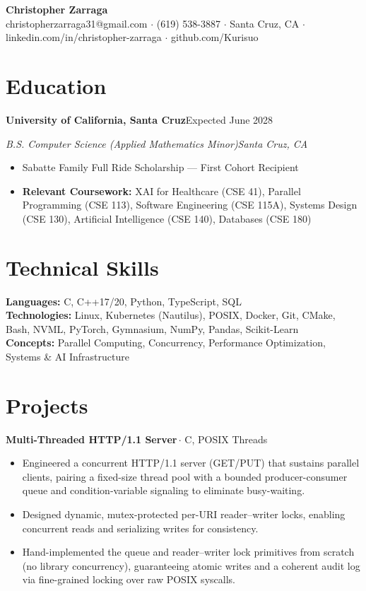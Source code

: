 \documentclass[letterpaper,10pt]{article}
\newcommand{\bull}[1]{\item\small{#1}}
\newcommand{\entryTwo}[4]{%
  \vspace{0.5pt}
  {\noindent\textbf{#1}\hfill\textcolor{slate}{\small #2}\par}
  {\noindent\textcolor{slate}{\small\textit{#3}}\hfill\textcolor{slate}{\small\textit{#4}}\par}
  \vspace{-1pt}
}
\newcommand{\projTitle}[2]{%
  \vspace{1pt}
  {\noindent\textbf{#1}\,\textcolor{slate}{\small #2}\par}
  \vspace{-1pt}
}
\begin{document}
\begin{center}
  {\Large\bfseries\color{navy} Christopher Zarraga}\\[1pt]
  {\small christopherzarraga31@gmail.com $\cdot$ (619) 538-3887 $\cdot$ Santa Cruz, CA $\cdot$ linkedin.com/in/christopher-zarraga $\cdot$ github.com/Kurisuo}
\end{center}

\section{Education}
\entryTwo{University of California, Santa Cruz}{Expected June 2028}{B.S. Computer Science (Applied Mathematics Minor)}{Santa Cruz, CA}
\begin{itemize}
  \bull{Sabatte Family Full Ride Scholarship --- First Cohort Recipient}
  \bull{\textbf{Relevant Coursework:} XAI for Healthcare (CSE 41), Parallel Programming (CSE 113), Software Engineering (CSE 115A), Systems Design (CSE 130), Artificial Intelligence (CSE 140), Databases (CSE 180)}
\end{itemize}

\section{Technical Skills}
\vspace{2pt}
\noindent\small
\textbf{Languages:} C, C++17/20, Python, TypeScript, SQL\\[1pt]
\textbf{Technologies:} Linux, Kubernetes (Nautilus), POSIX, Docker, Git, CMake, Bash, NVML, PyTorch, Gymnasium, NumPy, Pandas, Scikit-Learn\\[1pt]
\textbf{Concepts:} Parallel Computing, Concurrency, Performance Optimization, Systems \& AI Infrastructure

\section{Projects}
\projTitle{Multi-Threaded HTTP/1.1 Server}{$\cdot$ C, POSIX Threads}
\begin{itemize}
  \bull{Engineered a concurrent HTTP/1.1 server (GET/PUT) that sustains parallel clients, pairing a fixed-size thread pool with a bounded producer-consumer queue and condition-variable signaling to eliminate busy-waiting.}
  \bull{Designed dynamic, mutex-protected per-URI reader--writer locks, enabling concurrent reads and serializing writes for consistency.}
  \bull{Hand-implemented the queue and reader--writer lock primitives from scratch (no library concurrency), guaranteeing atomic writes and a coherent audit log via fine-grained locking over raw POSIX syscalls.}
\end{itemize}
\end{document}
